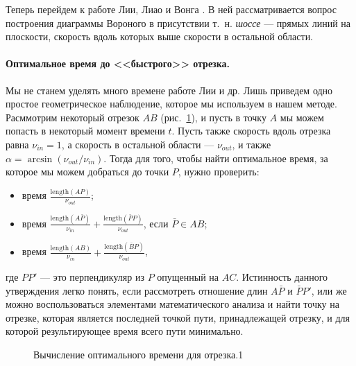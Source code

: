 \documentclass[12pt]{article}
\begin{document}
Теперь перейдем к работе Лии, Лиао и Вонга \cite{distmap}. В ней рассматривается 
вопрос построения диаграммы Вороного в присутствии т.~н. \emph{шоссе} ---
прямых линий на плоскости, скорость вдоль которых выше скорости в 
остальной области.

\paragraph{Оптимальное время до <<быстрого>> отрезка.} \label{segopt}
Мы не станем уделять много
времене работе Лии и др. Лишь приведем одно простое геометрическое наблюдение, 
которое мы используем в нашем методе. Расммотрим некоторый отрезок
$AB$ (рис.~\ref{fig_segopt}), и пусть в точку $A$ мы можем попасть в некоторый
момент времени $t$. Пусть также скорость вдоль отрезка равна $\nu_{in} = 1$, а
скорость в остальной области --- $\nu_{out}$, и также 
$\alpha = \arcsin(\nu_{out} / \nu_{in})$. Тогда для того, чтобы найти 
оптимальное время, за которое мы можем добраться до точки $P$, нужно
проверить:
\begin{itemize}
\item время $\frac{\mathrm{length}(AP)}{\nu_{out}}$;
\item время $\frac{\mathrm{length}(A\bar{P})}{\nu_{in}} + \frac{\mathrm{length}(\bar{P}P)}{\nu_{out}}$, если $\bar{P} \in AB$;
\item время $\frac{\mathrm{length}(AB)}{\nu_{in}} + \frac{\mathrm{length}(\bar{B}P)}{\nu_{out}}$,
\end{itemize}
где $PP'$ --- это перпендикуляр из $P$ опущенный на $AC$. 
Истинность данного утверждения легко понять, если рассмотреть
отношение длин $A\bar{P}$ и $\bar{P}P'$, или же можно воспользоваться 
элементами математического анализа и найти точку на отрезке,
которая является последней точкой пути, принадлежащей отрезку, и для которой
результирующее время всего пути минимально.
\begin{figure}
\label{fig_segopt}
\begin{center}
\end{center}
\caption{Вычисление оптимального времени для отрезка.1}
\end{figure}
\end{document}
